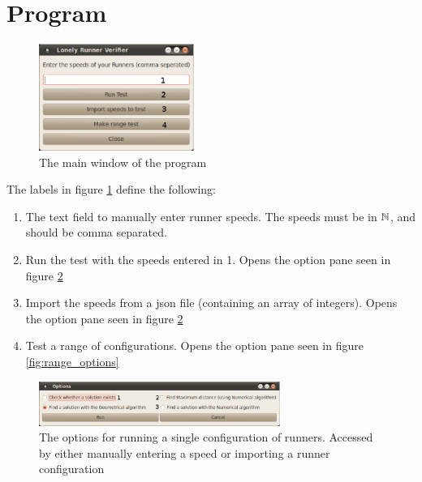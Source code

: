 \section{Program}

\begin{figure}[H]
  \centering
  \includegraphics[width=0.45\textwidth]{./images/Lonely_Runner_Verifier}
  \caption{\label{fig:main_window}The main window of the program}
\end{figure}

The labels in figure \ref{fig:main_window} define the following:
\begin{enumerate}
\item The text field to manually enter runner speeds. The speeds must be in $\mathbb{N}$, and should be comma separated.
\item Run the test with the speeds entered in 1. Opens the option pane seen in figure \ref{fig:options}
\item Import the speeds from a json file (containing an array of integers). Opens the option pane seen in figure \ref{fig:options}
\item Test a range of configurations. Opens the option pane seen in figure \ref{fig:range_options}
\end{enumerate}

\begin{figure}[H]
  \centering
  \includegraphics[width=0.70\textwidth]{./images/Options}
  \caption{\label{fig:options}The options for running a single configuration of runners. Accessed by either manually entering a speed or importing a runner configuration}
\end{figure}

